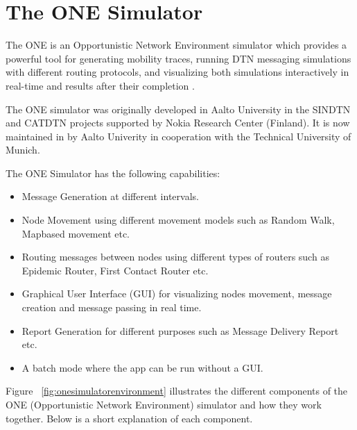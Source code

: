 \newpage
\section{The ONE Simulator}
The ONE is an Opportunistic Network Environment simulator \cite{the-one} which provides a powerful tool for generating mobility traces, running DTN messaging simulations with different routing protocols, and visualizing both simulations interactively in real-time and results after their completion \cite{the-one-ari}.

The ONE simulator was originally developed in Aalto University in the SINDTN \cite{sindtn} and CATDTN projects supported by Nokia Research Center (Finland). It is now maintained in by Aalto Univerity in cooperation with the Technical University of Munich.\newline

The ONE Simulator has the following capabilities:
\begin{itemize}
  \item Message Generation at different intervals.
  \item Node Movement using different movement models such as Random Walk, Mapbased movement etc.
  \item Routing messages between nodes using different types of routers such as Epidemic Router, First Contact Router etc.
  \item Graphical User Interface (GUI) for visualizing nodes movement, message creation and message passing in real time.
  \item Report Generation for different purposes such as Message Delivery Report etc.
  \item A batch mode where the app can be run without a GUI.
\end{itemize}

Figure ~\ref{fig:onesimulatorenvironment} illustrates the different components of the ONE (Opportunistic Network Environment) simulator and how they work together. Below is a short explanation of each component.


